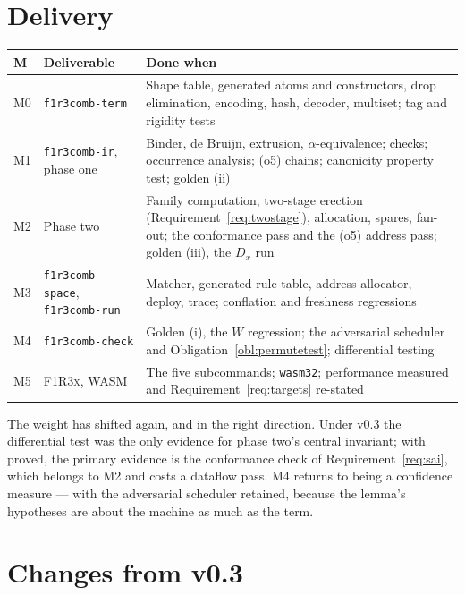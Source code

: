 \documentclass[11pt,a4paper]{article}
\newcommand{\code}[1]{\texttt{#1}}
\newcommand{\Fx}{\textsc{F1R3x}}
\theoremstyle{definition}
\theoremstyle{plain}
\begin{document}
\section{Delivery}

\begin{center}
\begin{tabularx}{\linewidth}{@{}ll>{\raggedright\arraybackslash}X@{}}
\toprule
M & Deliverable & Done when\\
\midrule
M0 & \code{f1r3comb-term} & Shape table, generated atoms and constructors,
drop elimination, encoding, hash, decoder, multiset; tag and rigidity tests\\
M1 & \code{f1r3comb-ir}, phase one & Binder, de Bruijn, extrusion,
$\alpha$-equivalence; checks; occurrence analysis; (o5) chains; canonicity
property test; golden (ii)\\
M2 & Phase two & Family computation, two-stage erection
(Requirement~\ref{req:twostage}), allocation, spares, fan-out; the
\cite[Def.~6.10]{draft3} conformance pass and the (o5) address pass; golden
(iii), the $D_{x}$ run\\
M3 & \code{f1r3comb-space}, \code{f1r3comb-run} & Matcher, generated rule
table, address allocator, deploy, trace; conflation and freshness regressions\\
M4 & \code{f1r3comb-check} & Golden (i), the $W$ regression; the adversarial
scheduler and Obligation~\ref{obl:permutetest}; differential testing\\
M5 & \Fx{}, WASM & The five subcommands; \code{wasm32}; performance measured
and Requirement~\ref{req:targets} re-stated\\
\bottomrule
\end{tabularx}
\end{center}

\noindent
The weight has shifted again, and in the right direction. Under v0.3 the
differential test was the only evidence for phase two's central invariant;
with \cite[Lem.~6.11]{draft3} proved, the primary evidence is the conformance
check of Requirement~\ref{req:sai}, which belongs to M2 and costs a dataflow
pass. M4 returns to being a confidence measure --- with the adversarial
scheduler retained, because the lemma's hypotheses are about the machine as
much as the term.

\section{Changes from v0.3}\label{sec:v3delta}
\end{document}
